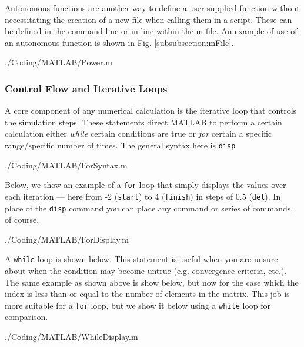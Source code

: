 Autonomous functions are another way to define a user-supplied function without necessitating the creation of a new file when calling them in a script. These can be defined in the command line or in-line within the m-file. An example of use of an autonomous function is shown in Fig. \ref{subsubsection:mFile}.

				
				{./Coding/MATLAB/Power.m}

\newpage
\subsubsection{Control Flow and Iterative Loops}

A core component of any numerical calculation is the iterative loop that controls the simulation steps. These statements direct MATLAB to perform a certain calculation either \emph{while} certain conditions are true or \emph{for} certain a specific range/specific number of times. The general syntax here is {\lstinline[style=Matlab-editor]!disp!} 

				
				{./Coding/MATLAB/ForSyntax.m}
			
Below, we show an example of a {\lstinline[style=Matlab-editor]!for!} loop that simply displays the values over each iteration --- here from -2 ({\lstinline[style=Matlab-editor]!start!}) to 4 ({\lstinline[style=Matlab-editor]!finish!}) in steps of 0.5 ({\lstinline[style=Matlab-editor]!del!}). In place of the {\lstinline[style=Matlab-editor]!disp!} command you can place any command or series of commands, of course. 

				
				{./Coding/MATLAB/ForDisplay.m}

A {\lstinline[style=Matlab-editor]!while!} loop is shown below. This statement is useful when you are unsure about when the condition may become untrue (e.g. convergence criteria, etc.). The same example as shown above is show below, but now for the case which the index is less than or equal to the number of elements in the matrix. This job is more suitable for a {\lstinline[style=Matlab-editor]!for!} loop, but we show it below using a {\lstinline[style=Matlab-editor]!while!} loop for comparison. 

				
				{./Coding/MATLAB/WhileDisplay.m}

